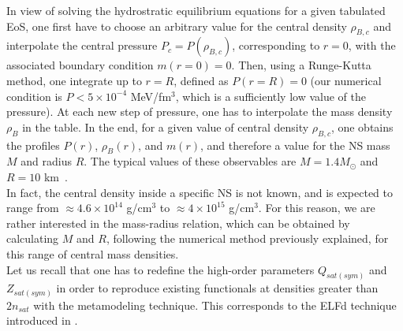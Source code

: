 In view of solving the hydrostratic equilibrium equations for a given tabulated 
EoS, one first have to choose an arbitrary value for the central density $\rho_{B,c}$ and 
interpolate the central pressure $P_c = P(\rho_{B,c})$, corresponding to $r=0$, 
with the associated boundary condition $m(r=0) = 0$. Then, using a Runge-Kutta 
method, one integrate up to $r=R$, defined as $P(r=R) = 0$ (our numerical 
condition is $P < 5\times 10^{-4}$ MeV/fm$^{3}$, which is a sufficiently low 
value of the pressure). At each new step of pressure, one has to interpolate 
the mass density $\rho_B$ in the table. In the end, for a given value of central 
density $\rho_{B,c}$, one obtains the profiles $P(r)$, $\rho_B(r)$, and $m(r)$, 
and therefore a value for the NS mass $M$ and radius $R$. The typical values 
of these observables are $M=1.4M_\odot$ and $R=10$ km~\cite{Haensel2007}.\\
In fact, the central density inside a specific NS is not known, and is expected
to range from $\approx 4.6\times 10^{14}$ g/cm$^3$ to $\approx 4\times 10^{15}$
g/cm$^3$. For this reason, we are rather interested in the mass-radius relation, which
can be obtained by calculating $M$ and $R$, following the numerical method
previously explained, for this range of central mass densities.\\
Let us recall that one has to redefine the high-order parameters $Q_{sat(sym)}$ 
and $Z_{sat(sym)}$ in order to reproduce existing functionals at densities
greater than $2n_{sat}$ with the metamodeling technique. This corresponds to
the ELFd technique introduced in \cite{Margueron2018a}.

